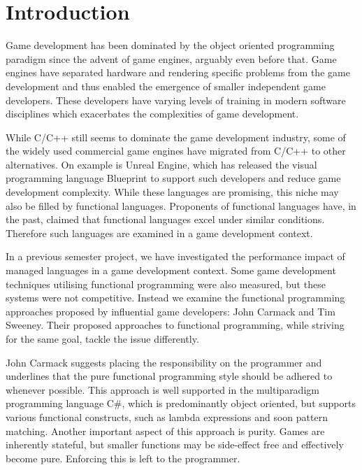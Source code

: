 \chapter{Introduction} \label{chap:introduction}
Game development has been dominated by the object oriented programming paradigm since the advent of game engines\cite{anderson2011:scripting-classes}, arguably even before that. Game engines have separated hardware and rendering specific problems from the game development and thus enabled the emergence of smaller independent game developers\cite{michael2003indie}. These developers have varying levels of training in modern software disciplines\cite{mcgill2009defining, hewner2010game} which exacerbates the complexities of game development\cite{blow2004game}.

While C/C++ still seems to dominate the game development industry\cite{wikipedia:list:of:game:engines}, some of the widely used commercial game engines have migrated from C/C++ to other alternatives. On example is Unreal Engine, which has released the visual programming language Blueprint\cite{unreal:blueprint:intro} to support such developers and reduce game development complexity\cite{unreal:blueprint:overview}. While these languages are promising, this niche may also be filled by functional languages. Proponents of functional languages have, in the past, claimed that functional languages excel under similar conditions\cite{kemerer2009impact, hughes1989functional, hu2015functional}. Therefore such languages are examined in a game development context.

In a previous semester project, we have investigated the performance impact of managed languages in a game development context\cite{p92018gameplay}. Some game development techniques utilising functional programming were also measured, but these systems were not competitive. Instead we examine the functional programming approaches proposed by influential game developers: John Carmack and Tim Sweeney. Their proposed approaches to functional programming, while striving for the same goal, tackle the issue differently.


John Carmack suggests placing the responsibility on the programmer and underlines that the pure functional programming style should be adhered to whenever possible\cite{gamasutra:c++functional}. This approach is well supported in the multiparadigm programming language C\#, which is predominantly object oriented, but supports various functional constructs, such as lambda expressions\cite{csharp:lambda} and soon pattern matching\cite{csharp:pattern:matching}. Another important aspect of this approach is purity. Games are inherently stateful\cite{games:stateful}, but smaller functions may be side-effect free and effectively become pure. Enforcing this is left to the programmer.

